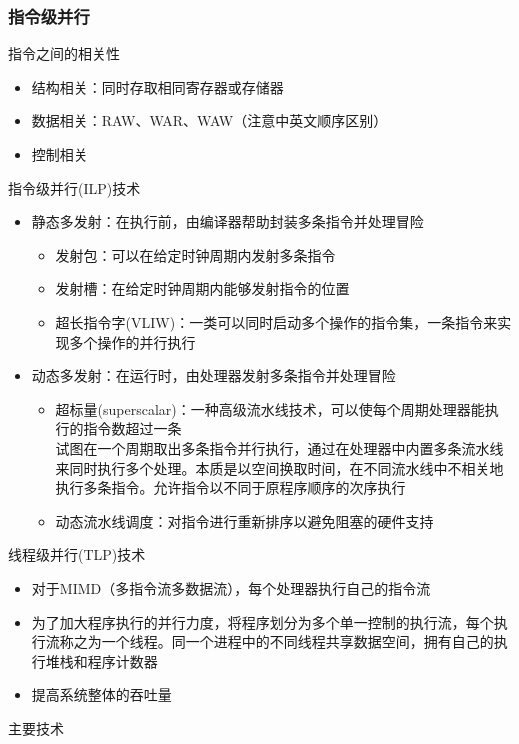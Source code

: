 \subsubsection{指令级并行}
指令之间的相关性
\begin{itemize}
	\item 结构相关：同时存取相同寄存器或存储器
	\item 数据相关：RAW、WAR、WAW（注意中英文顺序区别）
	\item 控制相关
\end{itemize}
指令级并行(ILP)技术
\begin{itemize}
	\item 静态多发射：在执行前，由编译器帮助封装多条指令并处理冒险
	\begin{itemize}
		\item 发射包：可以在给定时钟周期内发射多条指令
		\item 发射槽：在给定时钟周期内能够发射指令的位置
		\item 超长指令字(VLIW)：一类可以同时启动多个操作的指令集，一条指令来实现多个操作的并行执行
	\end{itemize}
	\item 动态多发射：在运行时，由处理器发射多条指令并处理冒险
	\begin{itemize}
		\item 超标量(superscalar)：一种高级流水线技术，可以使每个周期处理器能执行的指令数超过一条\\
	试图在一个周期取出多条指令并行执行，通过在处理器中内置多条流水线来同时执行多个处理。本质是以空间换取时间，在不同流水线中不相关地执行多条指令。允许指令以不同于原程序顺序的次序执行
		\item 动态流水线调度：对指令进行重新排序以避免阻塞的硬件支持
	\end{itemize}
\end{itemize}
线程级并行(TLP)技术
\begin{itemize}
	\item 对于MIMD（多指令流多数据流），每个处理器执行自己的指令流
	\item 为了加大程序执行的并行力度，将程序划分为多个单一控制的执行流，每个执行流称之为一个线程。同一个进程中的不同线程共享数据空间，拥有自己的执行堆栈和程序计数器
	\item 提高系统整体的吞吐量
\end{itemize}
主要技术
